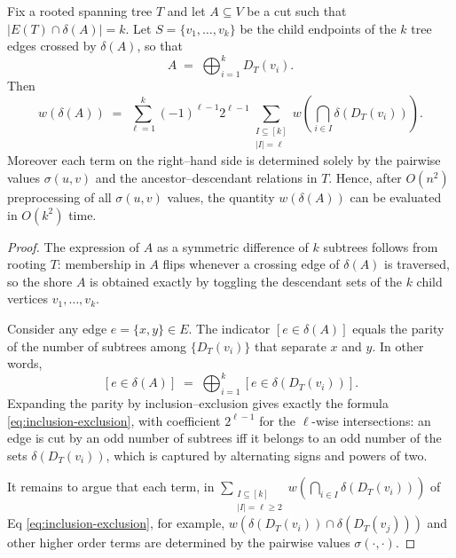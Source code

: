 \documentclass[10pt,a4paper]{amsart}
\begin{document}
\begin{lemma}
\label{lem:krespect-eval}
Fix a rooted spanning tree $T$ and let $A\subseteq V$ be a cut
such that $|E(T)\cap \delta(A)|=k$.
Let $S=\{v_1,\dots,v_k\}$ be the child endpoints of the $k$ tree edges
crossed by $\delta(A)$, so that
\[
A \;=\; \bigoplus_{i=1}^k D_T(v_i).
\]
Then
\begin{equation}
\label{eq:inclusion-exclusion}
w(\delta(A)) \;=\;
\sum_{\ell=1}^k (-1)^{\ell-1} 2^{\ell-1}
  \sum_{\substack{I\subseteq [k]\\ |I|=\ell}}
  w\!\left( \bigcap_{i\in I} \delta(D_T(v_i)) \right).
\end{equation}
Moreover each term on the right--hand side is determined solely by the pairwise
values $\sigma(u,v)$ and the ancestor--descendant relations in $T$.
Hence, after $O(n^2)$ preprocessing of all $\sigma(u,v)$ values,
the quantity $w(\delta(A))$ can be evaluated in $O(k^2)$ time.
\end{lemma}

\begin{proof}
The expression of $A$ as a symmetric difference of $k$ subtrees
follows from rooting $T$: membership in $A$ flips whenever a
crossing edge of $\delta(A)$ is traversed, so the shore $A$
is obtained exactly by toggling the descendant sets of the $k$ child
vertices $v_1,\dots,v_k$.

Consider any edge $e=\{x,y\}\in E$.
The indicator $[e\in \delta(A)]$ equals the parity of the number of
subtrees among $\{D_T(v_i)\}$ that separate $x$ and $y$.
In other words,
\[
[e\in \delta(A)] \;=\; \bigoplus_{i=1}^k [e\in \delta(D_T(v_i))].
\]
Expanding the parity by inclusion--exclusion gives exactly the formula
\eqref{eq:inclusion-exclusion}, with coefficient $2^{\ell-1}$ for the
$\ell$-wise intersections: an edge is cut by an odd number of subtrees
iff it belongs to an odd number of the sets $\delta(D_T(v_i))$,
which is captured by alternating signs and powers of two.

It remains to argue that each term, in $\sum_{\substack{I\subseteq [k]\\ |I|=\ell\geq2}}
  w\!\left( \bigcap_{i\in I} \delta(D_T(v_i)) \right)$ of Eq \ref{eq:inclusion-exclusion}, for example,
$w(\delta(D_T(v_i))\cap \delta(D_T(v_j)))$ and other higher order terms are determined by the pairwise values $\sigma(\cdot,\cdot)$.
\end{proof}
\end{document}
